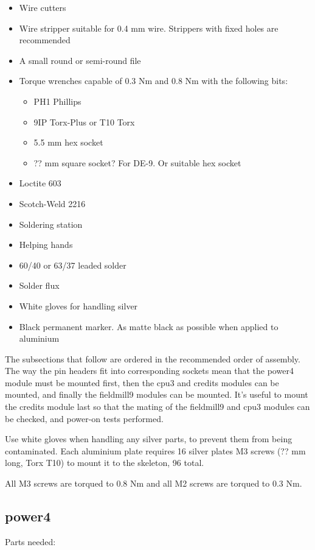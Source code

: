 \documentclass{article}
\begin{document}
\begin{itemize}
\item Wire cutters
\item Wire stripper suitable for 0.4 mm wire. Strippers with fixed holes are recommended
\item A small round or semi-round file
\item Torque wrenches capable of 0.3 Nm and 0.8 Nm with the following bits:
\begin{itemize}
\item PH1 Phillips
\item 9IP Torx-Plus or T10 Torx
\item 5.5 mm hex socket
\item ?? mm square socket? For DE-9. Or suitable hex socket
\end{itemize}
\item Loctite 603
\item Scotch-Weld 2216
\item Soldering station
\item Helping hands
\item 60/40 or 63/37 leaded solder
\item Solder flux
\item White gloves for handling silver
\item Black permanent marker. As matte black as possible when applied to aluminium
\end{itemize}

The subsections that follow are ordered in the recommended order of assembly.
The way the pin headers fit into corresponding sockets mean that the power4 module must be mounted first,
then the cpu3 and credits modules can be mounted, and finally the fieldmill9 modules can be mounted.
It's useful to mount the credits module last so that the mating of the fieldmill9 and cpu3 modules can be checked,
and power-on tests performed.

Use white gloves when handling any silver parts, to prevent them from being contaminated.
Each aluminium plate requires 16 silver plates M3 screws (?? mm long, Torx T10) to mount it to the skeleton, 96 total.

All M3 screws are torqued to 0.8 Nm and all M2 screws are torqued to 0.3 Nm.

\subsection{power4}

Parts needed:
\end{document}
